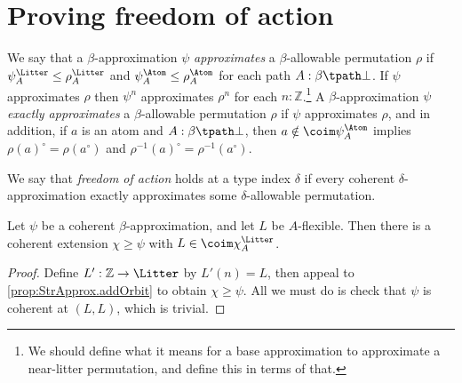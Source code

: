 \section{Proving freedom of action}
\begin{definition}[approximates]
  \label{def:StrApprox.Approximates}
  \leanok
  We say that a \( \beta \)-approximation \( \psi \) \emph{approximates} a \( \beta \)-allowable permutation \( \rho \) if \( \psi_A^\Litter \leq \rho_A^\Litter \) and \( \psi_A^\Atom \leq \rho_A^\Atom \) for each path \( A : \beta \tpath \bot \).
  If \( \psi \) approximates \( \rho \) then \( \psi^n \) approximates \( \rho^n \) for each \( n : \mathbb Z \).\footnote{We should define what it means for a base approximation to approximate a near-litter permutation, and define this in terms of that.}
  A \( \beta \)-approximation \( \psi \) \emph{exactly approximates} a \( \beta \)-allowable permutation \( \rho \) if \( \psi \) approximates \( \rho \), and in addition, if \( a \) is an atom and \( A : \beta \tpath \bot \), then \( a \notin \coim \psi_A^\Atom \) implies \( \rho(a)^\circ = \rho(a^\circ) \) and \( \rho^{-1}(a)^\circ = \rho^{-1}(a^\circ) \).
\end{definition}
\begin{definition}
  \label{def:FreedomOfAction}
  \leanok
  We say that \emph{freedom of action} holds at a type index \( \delta \) if every coherent \( \delta \)-approximation exactly approximates some \( \delta \)-allowable permutation.
\end{definition}
\begin{proposition}
  \label{prop:StrApprox.addFlexible}
  \leanok
  Let \( \psi \) be a coherent \( \beta \)-approximation, and let \( L \) be \( A \)-flexible.
  Then there is a coherent extension \( \chi \geq \psi \) with \( L \in \coim \chi_A^\Litter \).
\end{proposition}
\begin{proof}
  \leanok
  Define \( L' : \mathbb Z \to \Litter \) by \( L'(n) = L \), then appeal to \cref{prop:StrApprox.addOrbit} to obtain \( \chi \geq \psi \).
  All we must do is check that \( \psi \) is coherent at \( (L, L) \), which is trivial.
\end{proof}
